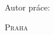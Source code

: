 \begin{titlepage}
	\centering

  \vfill

	{\LARGE \skola \par}
	{\Large \fakulta \par}

	\vfill

	{\huge\bfseries \nazev \par}
	{\Large \typPrace \par}

  \vfill

	{\Large Autor práce: \autor \par}

	\vspace{1.5cm}

	{\scshape\large Praha \the\year \par}

  \vfill
\end{titlepage}
